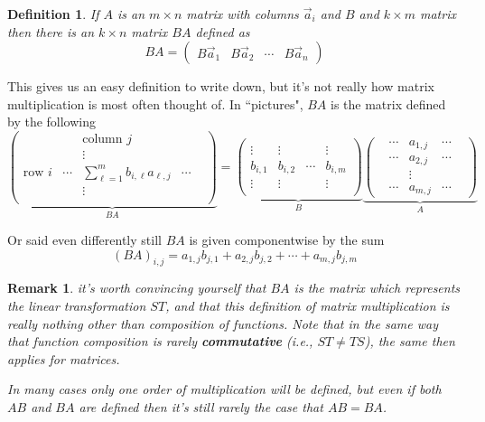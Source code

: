 \documentclass[12pt]{article}
\numberwithin{equation}{subsection}
\numberwithin{figure}{subsection}
\newtheorem{defn}[subsection]{Definition}
\theoremstyle{note}
\newtheorem{remark}[subsection]{Remark}
\begin{document}
\begin{defn}
	If $A$ is an $m\times n$ matrix with columns $\vec{a}_i$ and $B$ and $k\times m$ matrix then there is an $k\times n$ matrix $BA$ defined as \begin{equation} BA=\begin{pmatrix} B\vec{a}_1 & B\vec{a}_2 & \cdots & B\vec{a}_n\end{pmatrix} \end{equation} 
	\end{defn}
This gives us an easy definition to write down, but it's not really how matrix multiplication is most often thought of. In ``pictures", $BA$ is the matrix defined by the following 
\begin{equation} 
	\underbrace{\begin{pmatrix} & & \text{column $j$} & & \\ 
	& & \vdots & & \\
	\text{row $i$} &\cdots & \sum_{\ell=1}^m b_{i,\ell} a_{\ell,j}& \cdots & \\ 
	&&\vdots && \\
	\end{pmatrix}}_{BA} = 
	\underbrace{\begin{pmatrix}  & & &  \\ \vdots &\vdots &  &\vdots  \\ b_{i,1} & b_{i,2} & \cdots & b_{i,m} \\ \vdots & \vdots & & \vdots  \\ & & &\end{pmatrix}}_B
	\underbrace{\begin{pmatrix} & \cdots & a_{1,j} & \cdots & \\  & \cdots & a_{2,j} & \cdots & \\ & & \vdots & & \\  & \cdots  & a_{m,j} & \cdots & \end{pmatrix}}_A	
	  \end{equation}
	  
	  	Or said even differently still $BA$ is given componentwise by the sum \begin{equation} (BA)_{i,j}=a_{1,j}b_{j,1}+a_{2,j}b_{j,2}+\cdots+a_{m,j}b_{j,m}\end{equation}
		
		\begin{remark}
			it's worth convincing yourself that $BA$ is the matrix which represents the linear transformation $ST$, and that this definition of matrix multiplication is really nothing other than composition of functions. Note that in the same way that function composition is rarely \textbf{commutative} (i.e., $ST\neq TS$), the same then applies for matrices. 
			
			In many cases only one order of multiplication will be defined, but even if both $AB$ and $BA$ are defined then it's still rarely the case that $AB=BA$. 
		
		\end{remark}
		
\end{document}
